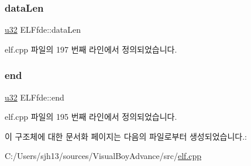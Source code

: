 \mbox{\label{struct_e_l_ffde_a078548d5c62467613c4a8d57dbfb3396}} 
\subsubsection{\texorpdfstring{data\+Len}{dataLen}}
{\footnotesize\ttfamily \mbox{\hyperlink{_system_8h_a10e94b422ef0c20dcdec20d31a1f5049}{u32}} E\+L\+Ffde\+::data\+Len}



elf.\+cpp 파일의 197 번째 라인에서 정의되었습니다.

\mbox{\label{struct_e_l_ffde_a7adc7f88e82c38114747df8361ba3c05}} 
\subsubsection{\texorpdfstring{end}{end}}
{\footnotesize\ttfamily \mbox{\hyperlink{_system_8h_a10e94b422ef0c20dcdec20d31a1f5049}{u32}} E\+L\+Ffde\+::end}



elf.\+cpp 파일의 195 번째 라인에서 정의되었습니다.



이 구조체에 대한 문서화 페이지는 다음의 파일로부터 생성되었습니다.\+:\begin{DoxyCompactItemize}
\item 
C\+:/\+Users/sjh13/sources/\+Visual\+Boy\+Advance/src/\mbox{\hyperlink{elf_8cpp}{elf.\+cpp}}\end{DoxyCompactItemize}
